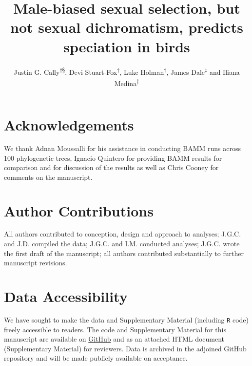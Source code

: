 \documentclass[]{article}
\title{Male-biased sexual selection, but not sexual dichromatism, predicts
speciation in birds}
\author{Justin G. Cally\textsuperscript{†§}, Devi Stuart-Fox\textsuperscript{†},
Luke Holman\textsuperscript{†}, James Dale\textsuperscript{‡} and Iliana
Medina\textsuperscript{†}}
\date{}
\begin{document}
\maketitle

\maketitle{}


\hypertarget{acknowledgements}{%
\section{Acknowledgements}\label{acknowledgements}}

We thank Adnan Moussalli for his assistance in conducting BAMM runs
across 100 phylogenetic trees, Ignacio Quintero for providing BAMM
results for comparison and for discussion of the results as well as
Chris Cooney for comments on the manuscript.


\hypertarget{author-contributions}{%
\section{Author Contributions}\label{author-contributions}}

All authors contributed to conception, design and approach to analyses;
J.G.C. and J.D. compiled the data; J.G.C. and I.M. conducted analyses;
J.G.C. wrote the first draft of the manuscript; all authors contributed
substantially to further manuscript revisions.


\hypertarget{data-accessibility}{%
\section{Data Accessibility}\label{data-accessibility}}

We have sought to make the data and Supplementary Material (including
\texttt{R} code) freely accessible to readers. The code and
Supplementary Material for this manuscript are available on
\href{https://justincally.github.io/SexualSelection_Speciation/}{GitHub}
and as an attached HTML document (Supplementary Material) for reviewers.
Data is archived in the adjoined GitHub repository and will be made
publicly available on acceptance.
\end{document}
